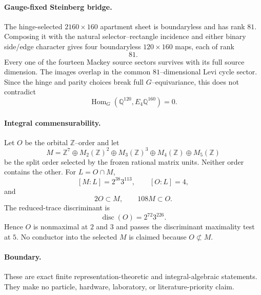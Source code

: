 \paragraph{Gauge-fixed Steinberg bridge.}
The hinge-selected $2160\times160$ apartment sheet is boundaryless and has rank $81$.  Composing it with the natural selector--rectangle incidence and either binary side/edge character gives four boundaryless $120\times160$ maps, each of rank
\[
\boxed{81}.
\]
Every one of the fourteen Mackey source sectors survives with its full source dimension.  The images overlap in the common $81$--dimensional Levi cycle sector.  Since the hinge and parity choices break full $G$--equivariance, this does not contradict
\[
\operatorname{Hom}_G(\mathbb Q^{120},E_4\mathbb Q^{160})=0.
\]

\paragraph{Integral commensurability.}
Let $O$ be the orbital $\mathbb Z$--order and let
\[
M=\mathbb Z^7\oplus M_2(\mathbb Z)^2\oplus M_3(\mathbb Z)^3
\oplus M_4(\mathbb Z)\oplus M_5(\mathbb Z)
\]
be the split order selected by the frozen rational matrix units.  Neither order contains the other.  For $L=O\cap M$,
\[
[M:L]=2^{38}3^{113},
\qquad
[O:L]=4,
\]
and
\[
2O\subset M,
\qquad
108M\subset O.
\]
The reduced-trace discriminant is
\[
\boxed{\operatorname{disc}(O)=2^{72}3^{226}}.
\]
Hence $O$ is nonmaximal at $2$ and $3$ and passes the discriminant maximality test at $5$.  No conductor into the selected $M$ is claimed because $O\not\subset M$.

\paragraph{Boundary.}
These are exact finite representation-theoretic and integral-algebraic statements.  They make no particle, hardware, laboratory, or literature-priority claim.
